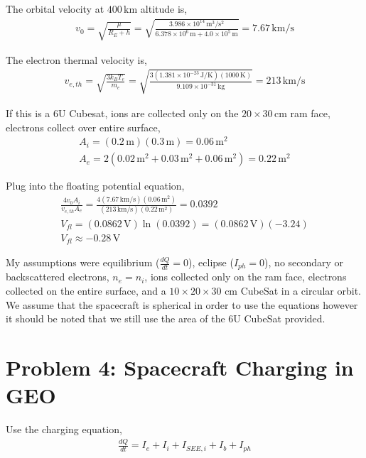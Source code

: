 \documentclass[11pt]{article}
\begin{document}
\hspace*{2em}The orbital velocity at $400\,\mathrm{km}$ altitude is,
\begin{gather*}
v_0 = \sqrt{\frac{\mu}{R_E + h}} = \sqrt{\frac{3.986\times10^{14}\,\mathrm{m^3/s^2}}{6.378\times10^{6}\,\mathrm{m} + 4.0\times10^{5}\,\mathrm{m}}} = 7.67\,\mathrm{km/s}
\end{gather*}

\hspace*{2em}The electron thermal velocity is,
\begin{gather*}
v_{e,th} = \sqrt{\frac{3 k_B T_e}{m_e}} = \sqrt{\frac{3(1.381\times10^{-23}\,\mathrm{J/K})(1000\,\mathrm{K})}{9.109\times10^{-31}\,\mathrm{kg}}} = 213\,\mathrm{km/s}
\end{gather*}

\hspace*{2em}If this is a 6U Cubesat, ions are collected
only on the $20 \times 30\,\mathrm{cm}$ ram face, electrons collect over entire surface,
\begin{gather*}
A_i = (0.2\,\mathrm{m})(0.3\,\mathrm{m}) = 0.06\,\mathrm{m^2} \\
A_e = 2(0.02\,\mathrm{m^2} + 0.03\,\mathrm{m^2} + 0.06\,\mathrm{m^2}) = 0.22\,\mathrm{m^2}
\end{gather*}

\hspace*{2em}Plug into the floating potential equation,
\begin{gather*}
\frac{4 v_0 A_i}{v_{e,th} A_e} = \frac{4(7.67\,\mathrm{km/s})(0.06\,\mathrm{m^2})}{(213\,\mathrm{km/s})(0.22\,\mathrm{m^2})} = 0.0392 \\
V_{fl} = (0.0862\,\mathrm{V})\ln(0.0392) = (0.0862\,\mathrm{V})(-3.24) \\
\boxed{V_{fl} \approx -0.28\,\mathrm{V}}
\end{gather*}

\hspace*{2em}My assumptions were equilibrium ($\frac{dQ}{dt} = 0$), eclipse ($I_{ph} = 0$), no secondary or backscattered
electrons, $n_e = n_i$, ions collected only on the ram face, electrons collected on the entire surface, and a
$10 \times 20 \times 30$ cm CubeSat in a circular orbit. We assume that the spacecraft is spherical in order to use the equations however
it should be noted that we still use the area of the 6U CubeSat provided. 

\newpage
\section*{Problem 4: Spacecraft Charging in GEO}
\hspace*{2em}Use the charging equation,
\begin{gather*}
\frac{dQ}{dt} = I_e + I_i + I_{SEE,i} + I_b + I_{ph}
\end{gather*}
\end{document}
